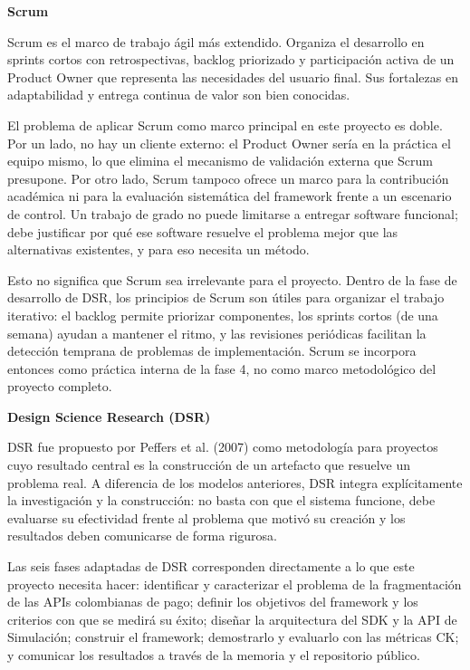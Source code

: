 \textbf{Scrum}

Scrum es el marco de trabajo ágil más extendido. Organiza el desarrollo en sprints cortos con retrospectivas, backlog priorizado y participación activa de un Product Owner que representa las necesidades del usuario final. Sus fortalezas en adaptabilidad y entrega continua de valor son bien conocidas.

El problema de aplicar Scrum como marco principal en este proyecto es doble. Por un lado, no hay un cliente externo: el Product Owner sería en la práctica el equipo mismo, lo que elimina el mecanismo de validación externa que Scrum presupone. Por otro lado, Scrum tampoco ofrece un marco para la contribución académica ni para la evaluación sistemática del framework frente a un escenario de control. Un trabajo de grado no puede limitarse a entregar software funcional; debe justificar por qué ese software resuelve el problema mejor que las alternativas existentes, y para eso necesita un método.

Esto no significa que Scrum sea irrelevante para el proyecto. Dentro de la fase de desarrollo de DSR, los principios de Scrum son útiles para organizar el trabajo iterativo: el backlog permite priorizar componentes, los sprints cortos (de una semana) ayudan a mantener el ritmo, y las revisiones periódicas facilitan la detección temprana de problemas de implementación. Scrum se incorpora entonces como práctica interna de la fase 4, no como marco metodológico del proyecto completo.

\textbf{Design Science Research (DSR)}

DSR fue propuesto por Peffers et al. (2007) como metodología para proyectos cuyo resultado central es la construcción de un artefacto que resuelve un problema real. A diferencia de los modelos anteriores, DSR integra explícitamente la investigación y la construcción: no basta con que el sistema funcione, debe evaluarse su efectividad frente al problema que motivó su creación y los resultados deben comunicarse de forma rigurosa.

Las seis fases adaptadas de DSR corresponden directamente a lo que este proyecto necesita hacer: identificar y caracterizar el problema de la fragmentación de las APIs colombianas de pago; definir los objetivos del framework y los criterios con que se medirá su éxito; diseñar la arquitectura del SDK y la API de Simulación; construir el framework; demostrarlo y evaluarlo con las métricas CK; y comunicar los resultados a través de la memoria y el repositorio público.

